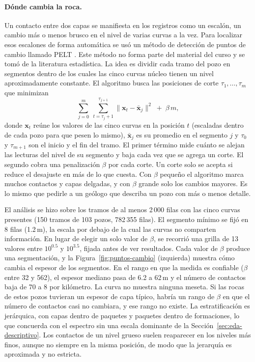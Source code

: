 \documentclass[11pt,a4paper]{article}
\begin{document}
\paragraph{Dónde cambia la roca.} Un contacto entre dos capas se manifiesta en los registros como un escalón, un cambio más o menos brusco en el nivel de varias curvas a la vez. Para localizar esos escalones de forma automática se usó un método de detección de puntos de cambio llamado PELT \cite{killick2012}. Este método no forma parte del material del curso y se tomó de la literatura estadística. La idea es dividir cada tramo del pozo en segmentos dentro de los cuales las cinco curvas núcleo tienen un nivel aproximadamente constante. El algoritmo busca las posiciones de corte $\tau_1, \dots, \tau_m$ que minimizan
\begin{equation}
\sum_{j=0}^{m} \; \sum_{t=\tau_j+1}^{\tau_{j+1}} \lVert \mathbf{x}_t - \bar{\mathbf{x}}_j \rVert^2 \; + \; \beta\, m ,
\label{eq:pelt}
\end{equation}
donde $\mathbf{x}_t$ reúne los valores de las cinco curvas en la posición $t$ (escaladas dentro de cada pozo para que pesen lo mismo), $\bar{\mathbf{x}}_j$ es su promedio en el segmento $j$ y $\tau_0$ y $\tau_{m+1}$ son el inicio y el fin del tramo. El primer término mide cuánto se alejan las lecturas del nivel de su segmento y baja cada vez que se agrega un corte. El segundo cobra una penalización $\beta$ por cada corte. Un corte solo se acepta si reduce el desajuste en más de lo que cuesta. Con $\beta$ pequeño el algoritmo marca muchos contactos y capas delgadas, y con $\beta$ grande solo los cambios mayores. Es lo mismo que pedirle a un geólogo que describa un pozo con más o menos detalle.

El análisis se hizo sobre los tramos de al menos 2\,000 filas con las cinco curvas presentes (150 tramos de 103 pozos, 782\,355 filas). El segmento mínimo se fijó en 8 filas (1.2\,m), la escala por debajo de la cual las curvas no comparten información. En lugar de elegir un solo valor de $\beta$, se recorrió una grilla de 13 valores entre $10^{0.5}$ y $10^{3.5}$, fijada antes de ver resultados. Cada valor de $\beta$ produce una segmentación, y la Figura~\ref{fig:puntos-cambio} (izquierda) muestra cómo cambia el espesor de los segmentos. En el rango en que la medida es confiable ($\beta$ entre 32 y 562), el espesor mediano pasa de 6.2 a 62\,m y el número de contactos baja de 70 a 8 por kilómetro. La curva no muestra ninguna meseta. Si las rocas de estos pozos tuvieran un espesor de capa típico, habría un rango de $\beta$ en que el número de contactos casi no cambiara, y ese rango no existe. La estratificación es jerárquica, con capas dentro de paquetes y paquetes dentro de formaciones, lo que concuerda con el espectro sin una escala dominante de la Sección~\ref{sec:eda-descriptivo}. Los contactos de un nivel grueso suelen reaparecer en los niveles más finos, aunque no siempre en la misma posición, de modo que la jerarquía es aproximada y no estricta.
\end{document}
